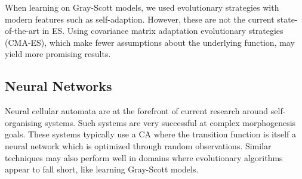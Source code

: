 When learning on Gray-Scott models, we used evolutionary strategies with modern features such as self-adaption. However, these are not the current state-of-the-art in ES. Using covariance matrix adaptation evolutionary strategies (CMA-ES), which make fewer assumptions about the underlying function, may yield more promising results.

\subsection{Neural Networks}

Neural cellular automata are at the forefront of current research around self-organising systems. Such systems are very successful at complex morphogenesis goals. These systems typically use a CA where the transition function is itself a neural network which is optimized through random observations. Similar techniques may also perform well in domains where evolutionary algorithms appear to fall short, like learning Gray-Scott models.

